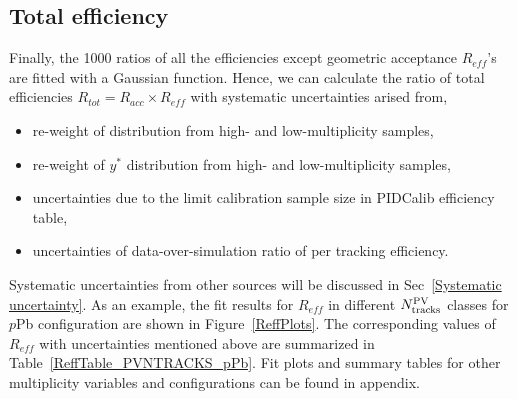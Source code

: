 \subsection{Total efficiency}
Finally, the 1000 ratios of all the efficiencies except geometric acceptance $R_{eff}$'s are fitted with a Gaussian function. Hence, we can calculate the ratio of total efficiencies $R_{tot}=R_{acc}\times R_{eff}$ with systematic uncertainties arised from,
\begin{itemize}
    \item re-weight of \pt distribution from high- and low-multiplicity samples,
    \item re-weight of $y^*$ distribution from high- and low-multiplicity samples,
    \item uncertainties due to the limit calibration sample size in PIDCalib efficiency table,
    \item uncertainties of data-over-simulation ratio of per tracking efficiency.
\end{itemize}
Systematic uncertainties from other sources will be discussed in Sec~\ref{Systematic uncertainty}. As an example, the fit results for $R_{eff}$ in different $N_{\rm tracks}^{\rm PV}$ classes for $p$Pb configuration are shown in Figure~\ref{ReffPlots}. The corresponding values of $R_{eff}$ with uncertainties mentioned above are summarized in Table~\ref{ReffTable_PVNTRACKS_pPb}. Fit plots and summary tables for other multiplicity variables and configurations can be found in appendix.
